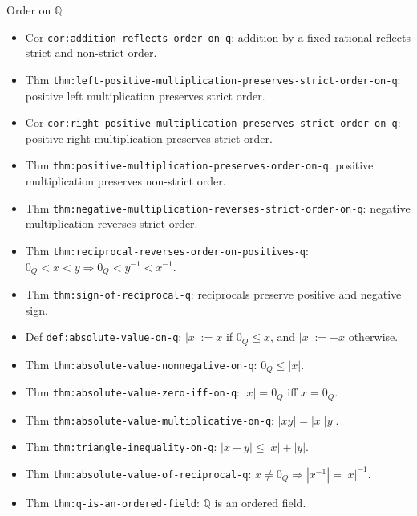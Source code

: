\begin{topicbox}{Order on \texorpdfstring{$\mathbb{Q}$}{Q}}
\begin{itemize}
  \item Cor \texttt{cor:addition-reflects-order-on-q}: addition by a fixed rational reflects strict and non-strict order.
  \item Thm \texttt{thm:left-positive-multiplication-preserves-strict-order-on-q}: positive left multiplication preserves strict order.
  \item Cor \texttt{cor:right-positive-multiplication-preserves-strict-order-on-q}: positive right multiplication preserves strict order.
  \item Thm \texttt{thm:positive-multiplication-preserves-order-on-q}: positive multiplication preserves non-strict order.
  \item Thm \texttt{thm:negative-multiplication-reverses-strict-order-on-q}: negative multiplication reverses strict order.
  \item Thm \texttt{thm:reciprocal-reverses-order-on-positives-q}: $0_Q<x<y\Rightarrow0_Q<y^{-1}<x^{-1}$.
  \item Thm \texttt{thm:sign-of-reciprocal-q}: reciprocals preserve positive and negative sign.
  \item Def \texttt{def:absolute-value-on-q}: $|x|:=x$ if $0_Q\le x$, and $|x|:=-x$ otherwise.
  \item Thm \texttt{thm:absolute-value-nonnegative-on-q}: $0_Q\le |x|$.
  \item Thm \texttt{thm:absolute-value-zero-iff-on-q}: $|x|=0_Q$ iff $x=0_Q$.
  \item Thm \texttt{thm:absolute-value-multiplicative-on-q}: $|xy|=|x||y|$.
  \item Thm \texttt{thm:triangle-inequality-on-q}: $|x+y|\le |x|+|y|$.
  \item Thm \texttt{thm:absolute-value-of-reciprocal-q}: $x\ne0_Q\Rightarrow |x^{-1}|=|x|^{-1}$.
  \item Thm \texttt{thm:q-is-an-ordered-field}: $\mathbb{Q}$ is an ordered field.
\end{itemize}
\end{topicbox}

